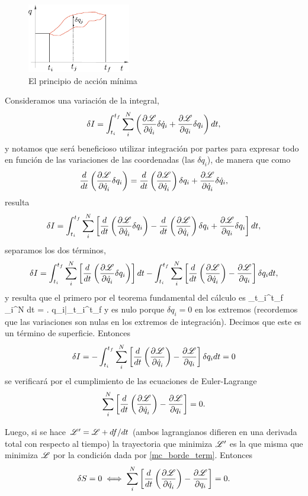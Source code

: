 \documentclass[10pt,oneside]{CBFT_book}
\begin{document}
\begin{figure}
	\begin{center}
	\includegraphics[width=0.4\textwidth]{images/fig_accion.pdf}	 
	\end{center}
	\caption{El principio de acción mínima}
\end{figure}

Consideramos una variación de la integral,
\[
	\delta I =  \int_{t_i}^{t_f} \sum_i^N \left( \dpar{\Lag}{\dot{q}_i} \delta \dot{q}_i +
	\dpar{\Lag}{q_i} \delta q_i  \right) dt,
\]
y notamos que será beneficioso utilizar integración por partes para expresar todo en función de
las variaciones de las coordenadas (las $\delta q_i$), de manera que como
\[
	\frac{d}{dt}\left( \dpar{\Lag}{\dot{q}_i} \delta q_i \right) =
	\frac{d}{dt}\left( \dpar{\Lag}{\dot{q}_i} \right) \delta q_i + \dpar{\Lag}{\dot{q}_i}\delta \dot{q}_i,
\]
resulta
\[
	\delta I =  \int_{t_i}^{t_f} \sum_i^N \left[ \frac{d}{dt}\left( \dpar{\Lag}{\dot{q}_i} \delta q_i \right) -
	\frac{d}{dt}\left( \dpar{\Lag}{\dot{q}_i} \right) \delta q_i + \dpar{\Lag}{q_i} \delta q_i  \right] dt,
\]
separamos los dos términos,
\[
	\delta I =  \int_{t_i}^{t_f} \sum_i^N \left[ \frac{d}{dt}\left( \dpar{\Lag}{\dot{q}_i} \delta q_i \right) 
	\right] dt - \int_{t_i}^{t_f} \sum_i^N \left[ \frac{d}{dt}\left( \dpar{\Lag}{\dot{q}_i} \right) - 
	\dpar{\Lag}{q_i} \right]  \delta q_i  dt,
\]
y resulta que el primero por el teorema fundamental del cálculo es
\be
	\int_{t_i}^{t_f} \sum_i^N  dt =
	\left.  \delta q_i\right|_{t_i}^{t_f}
\label{mc_borde_term}
\ee
y es nulo porque $\delta q_i=0$ en los extremos (recordemos que las variaciones son nulas en los extremos de
integración). Decimos que este es un término de superficie.
Entonces
\[
	\delta I =  -\int_{t_i}^{t_f} \sum_i^N \left[ \frac{d}{dt}\left( \dpar{\Lag}{\dot{q}_i} \right)
	- \dpar{\Lag}{q_i} \right]  \delta q_i  dt = 0
\]
se verificará por el cumplimiento de las ecuaciones de Euler-Lagrange
\[
	\sum_i^N  \left[ \frac{d}{dt}\left( \dpar{\Lag}{\dot{q}_i} \right) - \dpar{\Lag}{q_i} \right] = 0.
\]

Luego, si se hace $\Lag' = \Lag + df/dt$ (ambos lagrangianos difieren en una derivada total con 
respecto al tiempo) la trayectoria que minimiza $\Lag'$ es la que misma que minimiza
$\Lag$ por la condición dada por \eqref{mc_borde_term}. Entonces 
\[
	\delta S = 0 \iff \sum_i^N  \left[ \frac{d}{dt}\left( \dpar{\Lag}{\dot{q}_i} \right) -
	\dpar{\Lag}{q_i} \right] = 0.
\]
\end{document}
